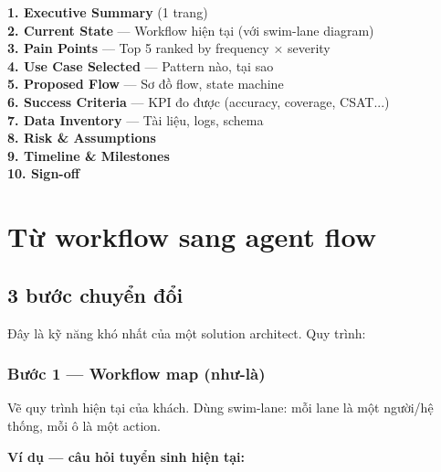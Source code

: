 \documentclass[11pt,a4paper]{article}
\begin{document}
\begin{tpl}[title=Discovery Report — Skeleton]
\textbf{1. Executive Summary} (1 trang)\\
\textbf{2. Current State} --- Workflow hiện tại (với swim-lane diagram)\\
\textbf{3. Pain Points} --- Top 5 ranked by frequency × severity\\
\textbf{4. Use Case Selected} --- Pattern nào, tại sao\\
\textbf{5. Proposed Flow} --- Sơ đồ flow, state machine\\
\textbf{6. Success Criteria} --- KPI đo được (accuracy, coverage, CSAT...)\\
\textbf{7. Data Inventory} --- Tài liệu, logs, schema\\
\textbf{8. Risk \& Assumptions}\\
\textbf{9. Timeline \& Milestones}\\
\textbf{10. Sign-off}
\end{tpl}

\clearpage

\section{Từ workflow sang agent flow}

\subsection{3 bước chuyển đổi}

Đây là kỹ năng khó nhất của một solution architect. Quy trình:

\subsubsection*{Bước 1 — Workflow map (như-là)}

Vẽ quy trình hiện tại của khách. Dùng swim-lane: mỗi lane là một người/hệ thống,
mỗi ô là một action.

\textbf{Ví dụ --- câu hỏi tuyển sinh hiện tại:}
\end{document}
